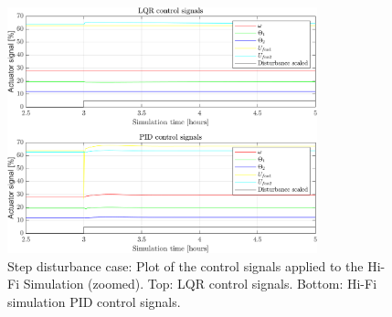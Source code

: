 \begin{figure}[H]
	\centering
	\includegraphics[width=0.8\textwidth]{Graphics/fig_inputs_stepDist_zoom.png}
	\caption{Step disturbance case: Plot of the control signals applied to the Hi-Fi Simulation (zoomed). Top: LQR control signals. Bottom: Hi-Fi simulation PID control signals.}
	\label{fig:inputs_stepDist_zoom}
\end{figure}